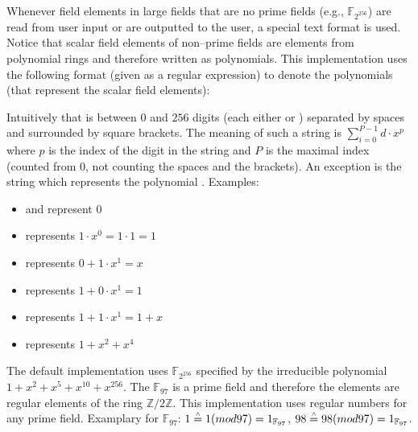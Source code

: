 




%
%
\label{sec:user-io}

Whenever field elements in large fields that are no prime fields (e.g.,
$\mathbb{F}_{2^{256}}$) are read from user input or are outputted to the user, a
special text format is used. Notice that scalar field elements of non--prime
fields are elements from polynomial rings and therefore written as polynomials.
This implementation uses the following format (given as a regular expression) to
denote the polynomials (that represent the scalar field elements):

\JWcode{\textbackslash[([01]( [01])\{0,255\})?\textbackslash]}

\noindent{}Intuitively that is between $0$ and $256$ digits (each either
 or ) separated by spaces and surrounded by square brackets.
The meaning of such a string is $\sum_{i=0}^{P-1} d \cdot x^p$ where $p$ is the
index of the digit in the string and $P$ is the maximal index (counted from $0$,
not counting the spaces and the brackets). An exception is the string
\JWcode{[]} which represents the polynomial .  Examples:

\begin{itemize}

  \item \JWcode{[]} and \JWcode{[0]} represent $0$

  \item \JWcode{[1]} represents $1 \cdot x^0 = 1 \cdot 1 = 1$

  \item \JWcode{[0 1]} represents $0 + 1 \cdot x^1 = x$

  \item \JWcode{[1 0]} represents $1 + 0 \cdot x^1 = 1$

  \item \JWcode{[1 1]} represents $1 + 1 \cdot x^1 = 1 + x$

  \item \JWcode{[1 0 1 0 1 0]} represents $1 + x^2 + x^4$

\end{itemize}

\noindent{}The default implementation uses $\mathbb{F}_{2^{256}}$ specified by
the irreducible polynomial $1 + x^2 + x^5 + x^{10} + x^{256}$. The
$\mathbb{F}_{97}$ is a prime field and therefore the elements are regular
elements of the ring $\mathbb{Z}/2\mathbb{Z}$.  This implementation uses regular
numbers for any prime field. Examplary for $\mathbb{F}_{97}$: $1 \stackrel{\scriptscriptstyle\wedge}{=} 1
(mod 97) = 1_{\mathbb{F}_{97}}$, $98 \stackrel{\scriptscriptstyle\wedge}{=} 98 (mod 97) =
1_{\mathbb{F}_{97}}$.


